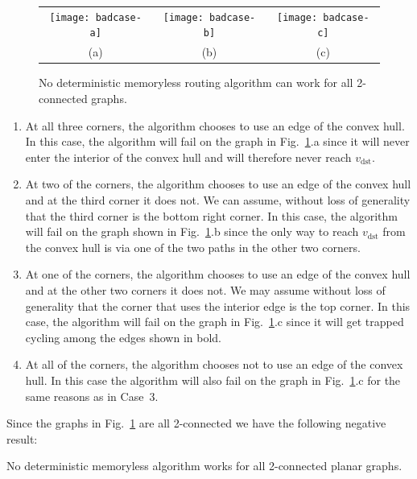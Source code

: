 \documentclass[final]{siamltex}
\newcommand{\figlabel}[1]{\label{fig:#1}}
\newcommand{\figref}[1]{\mbox{Fig.~\ref{fig:#1}}}
\newcommand{\vdest}{v_\mathrm{dst}}
\begin{document}
\begin{figure}
\begin{center}\begin{tabular}{ccc}
\texttt{[image: badcase-a]} & \texttt{[image: badcase-b]} &
\texttt{[image: badcase-c]} \\
(a) & (b) & (c) 
\end{tabular}\end{center}
\caption{No deterministic memoryless routing algorithm can work for
all 2-connected graphs.}\figlabel{badcase}
\end{figure}

\begin{enumerate}

\item At all three corners, the algorithm chooses to use an edge of
the convex hull.  In this case, the algorithm will fail on the graph 
in \figref{badcase}.a since it will never enter the interior of
the convex hull and will therefore never reach $\vdest$.

\item At two of the corners, the algorithm chooses to use an edge of
the convex hull and at the third corner it does not.  We can assume,
without loss of generality that the third corner is the bottom right
corner.  In this case, the algorithm will fail on the graph shown in
\figref{badcase}.b since the only way to reach $\vdest$ from the
convex hull is via one of the two paths in the other two corners.

\item At one of the corners, the algorithm chooses to use an edge of
the convex hull and at the other two corners it does not.  We may
assume without loss of generality that the corner that uses the
interior edge is the top corner.  In this case, the algorithm will
fail on the graph in \figref{badcase}.c since it will get trapped
cycling among the edges shown in bold.

\item At all of the corners, the algorithm chooses not to use an edge
of the convex hull.  In this case the algorithm will also fail on the
graph in \figref{badcase}.c for the same reasons as in Case~3.
\end{enumerate}

Since the graphs in \figref{badcase} are all 2-connected we have the
following negative result:

\begin{lemma}
No deterministic memoryless algorithm works for all 2-connected planar
graphs.
\end{lemma}
\end{document}

